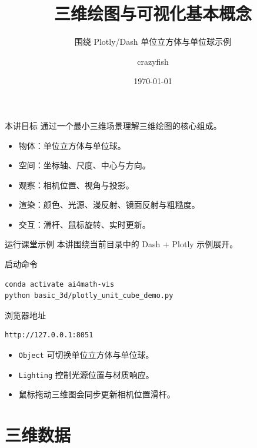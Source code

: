 \documentclass[aspectratio=169,11pt]{ctexbeamer}
\title{三维绘图与可视化基本概念}
\subtitle{围绕 Plotly/Dash 单位立方体与单位球示例}
\author{crazyfish}
\date{\today}
\begin{document}
\begin{frame}
  \titlepage
\end{frame}

\begin{frame}{本讲目标}
  通过一个最小三维场景理解三维绘图的核心组成。

  \begin{itemize}
    \item 物体：单位立方体与单位球。
    \item 空间：坐标轴、尺度、中心与方向。
    \item 观察：相机位置、视角与投影。
    \item 渲染：颜色、光源、漫反射、镜面反射与粗糙度。
    \item 交互：滑杆、鼠标旋转、实时更新。
  \end{itemize}
\end{frame}

\begin{frame}[fragile]{运行课堂示例}
  本讲围绕当前目录中的 Dash + Plotly 示例展开。

  \begin{block}{启动命令}
\begin{Verbatim}[fontsize=\small]
conda activate ai4math-vis
python basic_3d/plotly_unit_cube_demo.py
\end{Verbatim}
  \end{block}

  \begin{block}{浏览器地址}
\begin{Verbatim}[fontsize=\small]
http://127.0.0.1:8051
\end{Verbatim}
  \end{block}

  \begin{itemize}
    \item \texttt{Object} 可切换单位立方体与单位球。
    \item \texttt{Lighting} 控制光源位置与材质响应。
    \item 鼠标拖动三维图会同步更新相机位置滑杆。
  \end{itemize}
\end{frame}

\section{三维数据}
\end{document}
